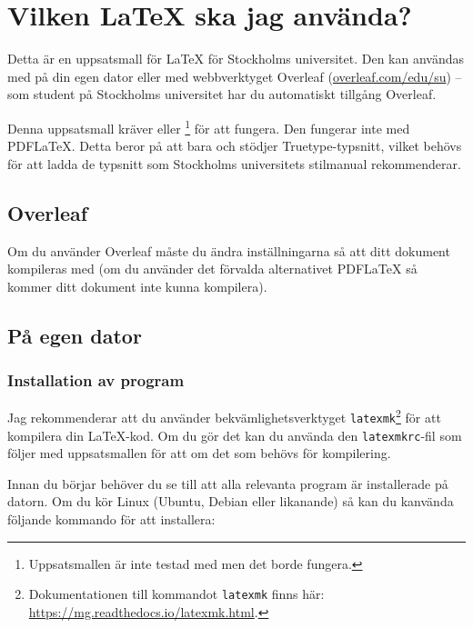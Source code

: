 
\section{Vilken \LaTeX{} ska jag använda?}
\label{latex}

Detta är en uppsatsmall för \LaTeX{} för Stockholms universitet. Den kan
användas med \XeLaTeX{} på din egen dator eller med webbverktyget Overleaf
(\href{https://overleaf.com/edu/su}{\url{overleaf.com/edu/su}}) -- som student
på Stockholms universitet har du automatiskt tillgång Overleaf.

Denna uppsatsmall kräver \XeLaTeX{} eller \LuaLaTeX{}\footnote{Uppsatsmallen är
  inte testad med \LuaLaTeX{} men det borde fungera.} för att fungera. Den
fungerar inte med PDF\LaTeX{}. Detta beror på att bara \XeLaTeX{} och \LuaLaTeX
stödjer Truetype-typsnitt, vilket behövs för att ladda de typsnitt som
Stockholms universitets stilmanual rekommenderar.


\subsection{Overleaf}

Om du använder Overleaf måste du ändra inställningarna så att ditt dokument
kompileras med \XeLaTeX{} (om du använder det förvalda alternativet PDF\LaTeX{}
så kommer ditt dokument inte kunna kompilera).


\subsection{På egen dator}

\subsubsection{Installation av program}

Jag rekommenderar att du använder bekvämlighetsverktyget
\texttt{latexmk}\footnote{Dokumentationen till kommandot \texttt{latexmk} finns
  här: \url{https://mg.readthedocs.io/latexmk.html}. } för att kompilera din
\LaTeX{}-kod. Om du gör det kan du använda den \texttt{latexmkrc}-fil som
följer med uppsatsmallen för att om det som behövs för kompilering.

Innan du börjar behöver du se till att alla relevanta program är installerade
på datorn. Om du kör Linux (Ubuntu, Debian eller likanande) så kan du kanvända
följande kommando för att installera:

